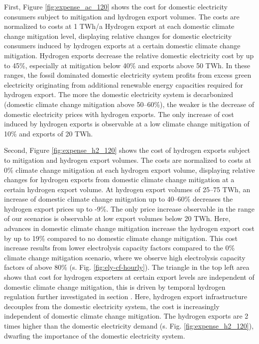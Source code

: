 First, Figure \ref{fig:expense_ac_120} shows the cost for domestic electricity consumers subject to mitigation and hydrogen export volumes. The costs are normalized to costs at 1 TWh/a Hydrogen export at each domestic climate change mitigation level, displaying relative changes for domestic electricity consumers induced by hydrogen exports at a certain domestic climate change mitigation.
Hydrogen exports decrease the relative domestic electricity cost by up to 45\%, especially at mitigation below 40\% and exports above 50 TWh. In these ranges, the fossil dominated domestic electricity system profits from excess green electricity originating from additional renewable energy capacities required for hydrogen export. The more the domestic electricity system is decarbonized (domestic climate change mitigation above 50--60\%), the weaker is the decrease of domestic electricity prices with hydrogen exports.
The only increase of cost induced by hydrogen exports is observable at a low climate change mitigation of 10\% and exports of 20 TWh. 

Second, Figure \ref{fig:expense_h2_120} shows the cost of hydrogen exports subject to mitigation and hydrogen export volumes. The costs are normalized to costs at 0\% climate change mitigation at each hydrogen export volume, displaying relative changes for hydrogen exports from domestic climate change mitigation at a certain hydrogen export volume.
At hydrogen export volumes of 25--75 TWh, an increase of domestic climate change mitigation up to 40--60\% decreases the hydrogen export prices up to -9\%. 
The only price increase observable in the range of our scenarios is observable at low export volumes below 20 TWh. Here, advances in domestic climate change mitigation increase the hydrogen export cost by up to 19\% compared to no domestic climate change mitigation.
This cost increase results from lower electrolysis capacity factors compared to the 0\% climate change mitigation scenario, where we observe high electrolysis capacity factors of above 80\% (s. Fig. \ref{fig:ely-cf-hourly}).
The triangle in the top left area shows that cost for hydrogen exporters at certain export levels are independent of domestic climate change mitigation, this is driven by temporal hydrogen regulation further investigated in section . Here, hydrogen export infrastructure decouples from the domestic electricity system, the cost is increasingly independent of domestic climate change mitigation. The hydrogen exports are 2 times higher than the domestic electricity demand (s. Fig. \ref{fig:expense_h2_120}), dwarfing the importance of the domestic electricity system.


